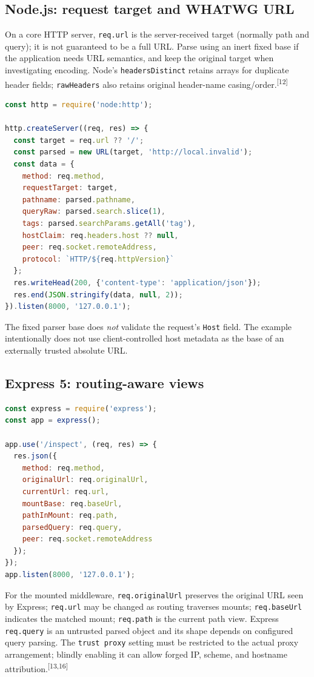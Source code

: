 \documentclass[10pt,letterpaper,oneside]{article}
\newcommand{\refs}[1]{\textsuperscript{\color{blue}[#1]}}
\newcommand{\code}[1]{\texttt{#1}}
\begin{document}
\subsection{Node.js: request target and WHATWG URL}
On a core HTTP server, \code{req.url} is the server-received target (normally path and query); it is not guaranteed to be a full URL. Parse using an inert fixed base if the application needs URL semantics, and keep the original target when investigating encoding. Node's \code{headersDistinct} retains arrays for duplicate header fields; \code{rawHeaders} also retains original header-name casing/order.\refs{12}
\begin{lstlisting}[language=JavaScript,caption={Node.js built-in HTTP diagnostic server}]
const http = require('node:http');

http.createServer((req, res) => {
  const target = req.url ?? '/';
  const parsed = new URL(target, 'http://local.invalid');
  const data = {
    method: req.method,
    requestTarget: target,
    pathname: parsed.pathname,
    queryRaw: parsed.search.slice(1),
    tags: parsed.searchParams.getAll('tag'),
    hostClaim: req.headers.host ?? null,
    peer: req.socket.remoteAddress,
    protocol: `HTTP/${req.httpVersion}`
  };
  res.writeHead(200, {'content-type': 'application/json'});
  res.end(JSON.stringify(data, null, 2));
}).listen(8000, '127.0.0.1');
\end{lstlisting}
The fixed parser base does \emph{not} validate the request's \code{Host} field. The example intentionally does not use client-controlled host metadata as the base of an externally trusted absolute URL.

\subsection{Express 5: routing-aware views}
\begin{lstlisting}[language=JavaScript,caption={Express mounted middleware: inspect relative URL views}]
const express = require('express');
const app = express();

app.use('/inspect', (req, res) => {
  res.json({
    method: req.method,
    originalUrl: req.originalUrl,
    currentUrl: req.url,
    mountBase: req.baseUrl,
    pathInMount: req.path,
    parsedQuery: req.query,
    peer: req.socket.remoteAddress
  });
});
app.listen(8000, '127.0.0.1');
\end{lstlisting}
For the mounted middleware, \code{req.originalUrl} preserves the original URL seen by Express; \code{req.url} may be changed as routing traverses mounts; \code{req.baseUrl} indicates the matched mount; \code{req.path} is the current path view. Express \code{req.query} is an untrusted parsed object and its shape depends on configured query parsing. The \code{trust proxy} setting must be restricted to the actual proxy arrangement; blindly enabling it can allow forged IP, scheme, and hostname attribution.\refs{13,16}
\end{document}
